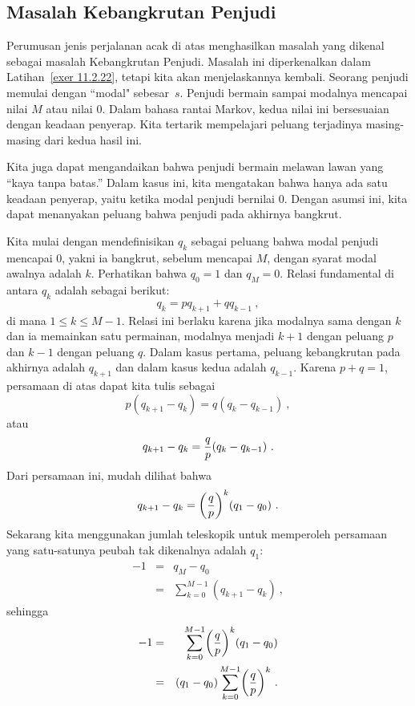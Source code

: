 \subsection*{Masalah Kebangkrutan Penjudi}

Perumusan jenis perjalanan acak di atas menghasilkan masalah yang dikenal
sebagai masalah Kebangkrutan Penjudi. Masalah ini
diperkenalkan dalam Latihan~\ref{exer 11.2.22}, tetapi kita akan menjelaskannya
kembali. Seorang penjudi memulai dengan ``modal" sebesar~$s$. Penjudi bermain
sampai modalnya mencapai nilai $M$ atau nilai 0. Dalam bahasa rantai Markov,
kedua nilai ini bersesuaian dengan keadaan penyerap. Kita tertarik mempelajari
peluang terjadinya masing-masing dari kedua hasil ini.  
\par
Kita juga dapat mengandaikan bahwa penjudi bermain melawan lawan yang ``kaya
tanpa batas.'' Dalam kasus ini, kita mengatakan bahwa hanya ada satu keadaan
penyerap, yaitu ketika modal penjudi bernilai 0. Dengan asumsi ini, kita dapat
menanyakan peluang bahwa penjudi pada akhirnya bangkrut. 
\par
Kita mulai dengan mendefinisikan $q_k$ sebagai peluang bahwa modal penjudi
mencapai 0, yakni ia bangkrut, sebelum mencapai $M$, dengan syarat modal awalnya
adalah $k$. Perhatikan bahwa $q_0 = 1$ dan $q_M = 0$. Relasi fundamental di
antara $q_k$ adalah sebagai berikut:
$$q_k = pq_{k+1} + qq_{k-1}\ ,$$
di mana $1 \le k \le M-1$. Relasi ini berlaku karena jika modalnya sama dengan
$k$ dan ia memainkan satu permainan, modalnya menjadi $k+1$ dengan peluang $p$
dan $k-1$ dengan peluang $q$. Dalam kasus pertama, peluang kebangkrutan pada
akhirnya adalah $q_{k+1}$ dan dalam kasus kedua adalah $q_{k-1}$. Karena
$p + q = 1$, persamaan di atas dapat kita tulis sebagai
$$p(q_{k+1} - q_k) = q(q_k - q_{k-1})\ ,$$
atau
$$q_{k+1} - q_k = {q\over p}(q_k - q_{k-1})\ .$$
Dari persamaan ini, mudah dilihat bahwa
\begin{equation}
q_{k+1} - q_k = \biggl({q\over p}\biggr)^k(q_1 - q_0)\ .
\label{eq 12.2.2}
\end{equation}
Sekarang kita menggunakan jumlah teleskopik untuk memperoleh persamaan yang
satu-satunya peubah tak dikenalnya adalah $q_1$:
\begin{eqnarray*}
-1 &=& q_M - q_0 \\
   &=& \sum_{k = 0}^{M-1} (q_{k+1} - q_k)\ ,
\end{eqnarray*}
sehingga
\begin{eqnarray*}
-1 &=& \sum_{k = 0}^{M-1} \biggl({q\over p}\biggr)^k(q_1 - q_0)\\
   &=& (q_1 - q_0) \sum_{k = 0}^{M-1} \biggl({q\over p}\biggr)^k\ .
\end{eqnarray*}
